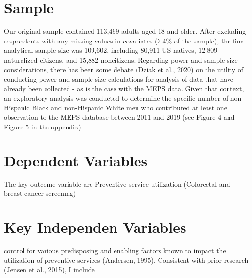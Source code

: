 \documentclass[../main.tex]{subfiles}
\begin{document}
\section{Sample}

Our original sample contained 113,499 adults aged 18 and older. After excluding respondents with any missing values in covariates (3.4\% of the sample), the final
analytical sample size was 109,602, including 80,911 US natives, 12,809 naturalized citizens, and 15,882 noncitizens. Regarding power and sample size
considerations, there has been some debate (Dziak et al., 2020) on the utility of conducting power and sample size calculations for analysis of data that have already been collected -
as is the case with the MEPS data. Given that context, an exploratory analysis was conducted to determine the specific number of non-Hispanic Black and non-Hispanic White men who contributed at least one observation to the MEPS database between 2011 and 2019 (see Figure 4 and Figure 5 in the appendix)

\section{Dependent Variables}

 The key outcome variable are Preventive service utilization (Colorectal and breast cancer screening)

\section{Key Independen Variables}


 control for various predisposing and enabling factors known to impact the utilization of preventive services (Andersen, 1995). Consistent with prior research (Jensen et al., 2015), I include
\end{document}
